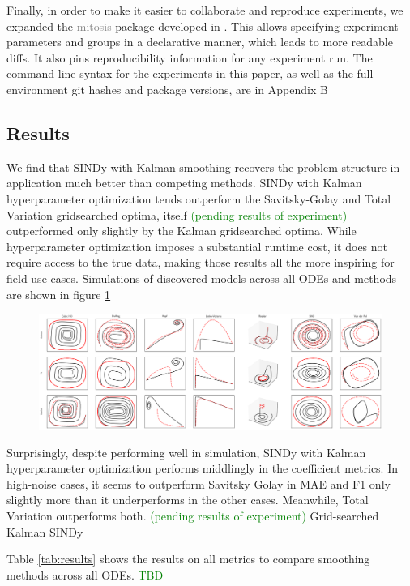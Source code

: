 \documentclass{article}
\newcommand{\gray}[1]{\textcolor{gray}{#1}}
\newcommand{\green}[1]{\textcolor{green}{#1}}
\begin{document}
Finally, in order to make it easier to collaborate and reproduce experiments, we expanded the \gray{mitosis} package developed in \cite{Stevens-Haas2022}.  This allows specifying experiment parameters and groups in a declarative manner, which leads to more readable diffs.  It also pins reproducibility information for any experiment run.  The command line syntax for the experiments in this paper, as well as the full environment git hashes and package versions, are in Appendix B

\subsection{Results}

We find that SINDy with Kalman smoothing recovers the problem structure in application much better than competing methods.  SINDy with Kalman hyperparameter optimization tends outperform the Savitsky-Golay and Total Variation gridsearched optima, itself \green{(pending results of experiment)} outperformed only slightly by the Kalman gridsearched optima.  While hyperparameter optimization imposes a substantial runtime cost, it does not require access to the true data, making those results all the more inspiring for field use cases.  Simulations of discovered models across all ODEs and methods are shown in figure \ref{fig:test}
\begin{figure}[h]
    \label{fig:test}
    \includegraphics[width=\textwidth]{images/summary_test}
\end{figure}

Surprisingly, despite performing well in simulation, SINDy with Kalman hyperparameter optimization performs middlingly in the coefficient metrics.  In high-noise cases, it seems to outperform Savitsky Golay in MAE and F1 only slightly more than it underperforms in the other cases.  Meanwhile, Total Variation outperforms both. \green{(pending results of experiment)}  Grid-searched Kalman SINDy


Table \ref{tab:results} shows the results on all metrics to compare smoothing methods across all ODEs. \green{TBD}
\end{document}
